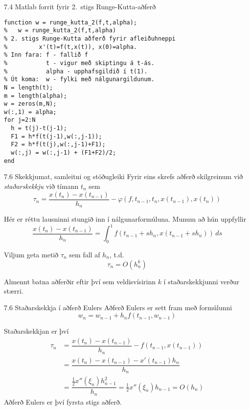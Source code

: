\begin{frame}[fragile]{7.4 Matlab forrit fyrir 2.~stigs Runge-Kutta-aðferð} 
\begin{verbatim}
function w = runge_kutta_2(f,t,alpha);
%   w = runge_kutta_2(f,t,alpha)
% 2. stigs Runge-Kutta aðferð fyrir afleiðuhneppi 
%         x'(t)=f(t,x(t)), x(0)=alpha. 
% Inn fara: f - fallið f 
%           t - vigur með skiptingu á t-ás. 
%           alpha - upphafsgildið í t(1). 
% Út koma:  w - fylki með nálgunargildunum. 
N = length(t);   
m = length(alpha); 
w = zeros(m,N);  
w(:,1) = alpha; 
for j=2:N 
  h = t(j)-t(j-1);
  F1 = h*f(t(j-1),w(:,j-1));
  F2 = h*f(t(j),w(:,j-1)+F1); 
  w(:,j) = w(:,j-1) + (F1+F2)/2; 
end 
\end{verbatim}
\end{frame}


\begin{frame}{7.6   Skekkjumat, samleitni og stöðugleiki} 
Fyrir eins skrefs aðferð skilgreinum við {\it staðarskekkju}
við tímann $t_n$ sem
$$ 
\tau_n = \dfrac{x(t_n)-x(t_{n-1})}{h_n} - 
\varphi(f,t_{n-1},t_n,x(t_{n-1}),x(t_{n})) 
$$

\pause
\smallskip
Hér er réttu lausninni stungið inn í nálgunarformúluna.
Munum að hún uppfyllir 
$$
\dfrac{x(t_n)-x(t_{n-1})}{h_n}
=\int_0^1 f(t_{n-1}+sh_n,x(t_{n-1}+sh_n))\, ds
$$

\pause
\smallskip
Viljum geta metið $\tau_n$ sem fall af $h_n$, t.d.
  $$ 
    \tau_n = O(h_n^k) 
  $$

\pause
\smallskip
Almennt batna aðferðir eftir því sem veldisvísirinn  $k$ 
í staðarskekkjunni verður stærri.
\end{frame}


\begin{frame}{7.6 Staðarskekkja í aðferð Eulers} 
Aðferð Eulers er sett fram með formúlunni
$$
  w_n=w_{n-1}+h_nf(t_{n-1},w_{n-1})
$$ 

\pause
Staðarskekkjan er því
\begin{align*}
  \tau_n&=\dfrac{x(t_n)-x(t_{n-1})}{h_n}-f(t_{n-1},x(t_{n-1}))\\
&=\dfrac{x(t_n)-x(t_{n-1})-x'(t_{n-1})h_n}{h_n}\\
&=\dfrac{\tfrac 12 x''(\xi_{n})h_{n-1}^2}{h_n}
=\tfrac 12 x''(\xi_{n})h_{n-1}=O(h_n)
\end{align*}
Aðferð Eulers er því fyrsta stigs aðferð.
\end{frame}



